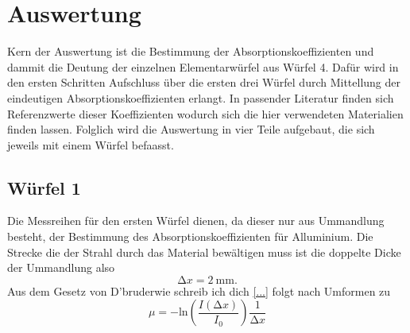 \section{Auswertung}
Kern der Auswertung ist die Bestimmung der Absorptionskoeffizienten und dammit die Deutung der einzelnen Elementarwürfel aus Würfel 4.
Dafür wird in den ersten Schritten Aufschluss über die ersten drei Würfel durch Mittellung der eindeutigen Absorptionskoeffizienten erlangt. 
In passender Literatur \cite{...} finden sich Referenzwerte dieser Koeffizienten wodurch sich die hier verwendeten Materialien finden lassen.  
Folglich wird die Auswertung in vier Teile aufgebaut, die sich jeweils mit einem Würfel befaasst.

\subsection{Würfel 1}
Die Messreihen für den ersten Würfel dienen, da dieser nur aus Ummandlung besteht, der Bestimmung des Absorptionskoeffizienten für Alluminium.
Die Strecke die der Strahl durch das Material bewältigen muss ist die doppelte Dicke der Ummandlung also
\begin{equation}
    \increment x = \SI{2}{\milli\meter}.
\end{equation}
Aus dem Gesetz von D'bruderwie schreib ich dich \eqref{...} folgt nach Umformen zu 
\begin{equation}
\mu = - \text{ln} \left( \frac{I(\increment x)}{I_0} \right) \frac{1}{\increment x}
\end{equation}